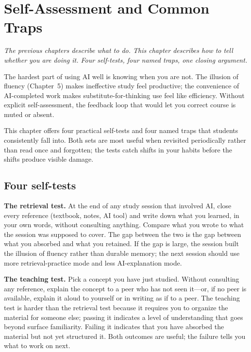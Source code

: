 \documentclass[11pt]{book}
\begin{document}
\chapter{Self-Assessment and Common Traps}
\label{ch:self-assessment}

\noindent \emph{The previous chapters describe what to do. This chapter describes how to tell whether you are doing it. Four self-tests, four named traps, one closing argument.}

\medskip

The hardest part of using AI well is knowing when you are not. The illusion of fluency (Chapter~5) makes ineffective study feel productive; the convenience of AI-completed work makes substitute-for-thinking use feel like efficiency. Without explicit self-assessment, the feedback loop that would let you correct course is muted or absent.

This chapter offers four practical self-tests and four named traps that students consistently fall into. Both sets are most useful when revisited periodically rather than read once and forgotten; the tests catch shifts in your habits before the shifts produce visible damage.

\section{Four self-tests}

\textbf{The retrieval test.} At the end of any study session that involved AI, close every reference (textbook, notes, AI tool) and write down what you learned, in your own words, without consulting anything. Compare what you wrote to what the session was supposed to cover. The gap between the two is the gap between what you absorbed and what you retained. If the gap is large, the session built the illusion of fluency rather than durable memory; the next session should use more retrieval-practice mode and less AI-explanation mode.

\textbf{The teaching test.} Pick a concept you have just studied. Without consulting any reference, explain the concept to a peer who has not seen it---or, if no peer is available, explain it aloud to yourself or in writing as if to a peer. The teaching test is harder than the retrieval test because it requires you to organize the material for someone else; passing it indicates a level of understanding that goes beyond surface familiarity. Failing it indicates that you have absorbed the material but not yet structured it. Both outcomes are useful; the failure tells you what to work on next.
\end{document}
